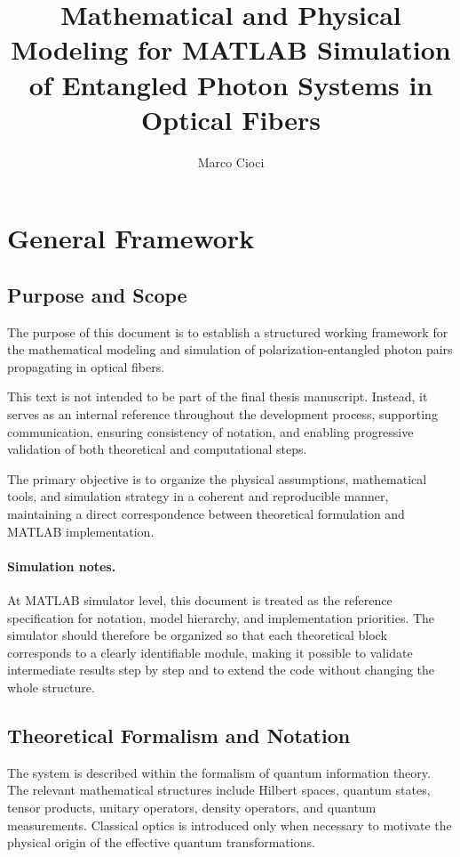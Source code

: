 \documentclass[a4paper]{article}
\title{Mathematical and Physical Modeling for MATLAB Simulation of Entangled Photon Systems in Optical Fibers}
\author{Marco Cioci}
\date{}
\begin{document}
\maketitle

\tableofcontents

\section{General Framework}

\subsection{Purpose and Scope}

The purpose of this document is to establish a structured working framework for the mathematical modeling and simulation of polarization-entangled photon pairs propagating in optical fibers.

This text is not intended to be part of the final thesis manuscript. Instead, it serves as an internal reference throughout the development process, supporting communication, ensuring consistency of notation, and enabling progressive validation of both theoretical and computational steps.

The primary objective is to organize the physical assumptions, mathematical tools, and simulation strategy in a coherent and reproducible manner, maintaining a direct correspondence between theoretical formulation and MATLAB implementation.

\paragraph{Simulation notes.}
At MATLAB simulator level, this document is treated as the reference specification for notation, model hierarchy, and implementation priorities. The simulator should therefore be organized so that each theoretical block corresponds to a clearly identifiable module, making it possible to validate intermediate results step by step and to extend the code without changing the whole structure.

\subsection{Theoretical Formalism and Notation}

The system is described within the formalism of quantum information theory. The relevant mathematical structures include Hilbert spaces, quantum states, tensor products, unitary operators, density operators, and quantum measurements. Classical optics is introduced only when necessary to motivate the physical origin of the effective quantum transformations.
\end{document}
